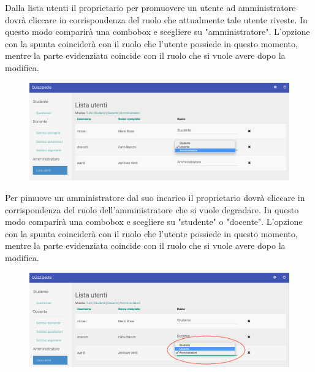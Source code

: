 \documentclass[12pt,a4paper]{article}
\begin{document}
	Dalla lista utenti il proprietario per promuovere un utente ad amministratore dovrà cliccare in corrispondenza del ruolo che attualmente tale utente riveste. In questo modo comparirà una combobox e scegliere su "amministratore". L'opzione con la spunta coinciderà con il ruolo che l'utente possiede in questo momento, mentre la parte evidenziata coincide con il ruolo che si vuole avere dopo la modifica.
	
		\begin{figure}[H]
			\centering
			\includegraphics[width=1\linewidth]{../img/screenshot/cambioRuoloDocAmm.png}
			\caption{}
			\label{Promozione ad amministratore}
		\end{figure}
	
	Per pimuove un amministratore dal suo incarico il proprietario dovrà cliccare in corrispondenza del ruolo dell'amministratore che si vuole degradare. In questo modo comparirà una combobox e scegliere su "studente" o "docente". L'opzione con la spunta coinciderà con il ruolo che l'utente possiede in questo momento, mentre la parte evidenziata coincide con il ruolo che si vuole avere dopo la modifica.
	
		\begin{figure}[H]
			\centering
			\includegraphics[width=1\linewidth]{../img/screenshot/cambioRuoloAmmDoc.png}
			\caption{}
			\label{Rimozione dal ruolo amministratore}
		\end{figure}
	
\end{document}
